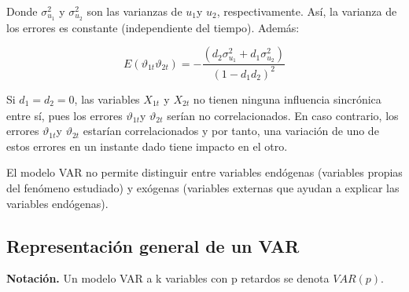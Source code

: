 Donde $\sigma_{u_{1}}^{2}$ y $\sigma_{u_{2}}^{2}$ son las varianzas de $u_{1}$y $u_{2}$, respectivamente. As\'{i}, la varianza de los errores es constante (independiente del tiempo). Adem\'{a}s:

\[
E\left( \vartheta_{1t}\vartheta_{2t} \right)=-\frac{(d_{2}\sigma_{u_{1}}^{2}+d_{1}\sigma_{u_{2}}^{2})}{{(1-d_{1}d_{2})}^{2}}
\]

Si $d_{1}=d_{2}=0$, las variables $X_{1t}_{\mathrm{}}$ y $X_{2t}$ no tienen ninguna influencia sincr\'{o}nica entre s\'{i}, pues los errores $\vartheta_{1t}$y $\vartheta_{2t}$ ser\'{i}an no correlacionados. En caso contrario, los errores $\vartheta_{1t}$y $\vartheta_{2t}$ estar\'{i}an correlacionados y por tanto, una variaci\'{o}n de uno de estos errores en un instante dado tiene impacto en el otro.

\begin{proposicion}
El modelo VAR no permite distinguir entre variables end\'{o}genas (variables propias del fen\'{o}meno estudiado) y ex\'{o}genas (variables externas que ayudan a explicar las variables end\'{o}genas).
\end{proposicion}

\subsection{Representaci\'{o}n general de un VAR}
\label{subsubsec:mylabel5}

\textbf{Notaci\'{o}n. } Un modelo VAR a k variables con p retardos se denota $VAR(p)$.

